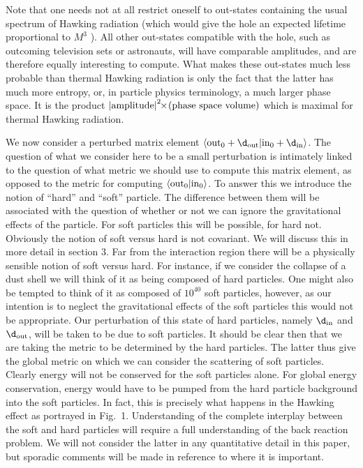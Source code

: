 Note that one needs not at all restrict oneself to out-states
containing the usual spectrum of Hawking radiation (which would give
the hole an expected lifetime proportional to $M^3$ ). All other
out-states compatible with the hole, such as outcoming television sets
or astronauts, will have comparable amplitudes, and are therefore
equally interesting to compute. What makes these out-states much less
probable than thermal Hawking radiation is only the fact that the
latter has much more entropy, or, in particle physics terminology, a
much larger phase space. It is the product $\left|{\rm
amplitude}\right|^2\!\!\times\!{\rm (phase~space~volume)}$ which is
maximal for thermal Hawking radiation.

We now consider a perturbed matrix element $\langle {\rm
out}_0+\d_{{\rm out}}|{\rm in}_0+\d_{{\rm in}}\rangle$. The question of
what we consider here to be a small perturbation is intimately linked
to the question of what metric we should use to compute this matrix
element, as opposed to the metric for computing $\langle {\rm
out}_0|{\rm in}_0\rangle$. To answer this we introduce the notion of
``hard'' and ``soft'' particle. The difference between them will be
associated with the question of whether or not we can ignore the
gravitational effects of the particle. For soft particles this will be
possible, for hard not. Obviously the notion of soft versus hard is not
covariant. We will discuss this in more detail in section 3. Far from
the interaction region there will be a physically sensible notion of
soft versus hard. For instance, if we consider the collapse of a dust
shell we will think of it as being composed of hard particles. One
might also be tempted to think of it as composed of $10^{40}$ soft
particles, however, as our intention is to neglect the gravitational
effects of the soft particles this would not be appropriate. Our
perturbation of this state of hard particles, namely $\d_{{\rm in}}$
and $\d_{{\rm out}}$, will be taken to be due to soft particles. It
should be clear then that we are taking the metric to be determined by
the hard particles. The latter thus give the global metric on which we
can consider the scattering of soft particles. Clearly energy will not
be conserved for the soft particles alone. For global energy
conservation, energy would have to be pumped from the hard particle
background into the soft particles. In fact, this is precisely what
happens in the Hawking effect as portrayed in Fig.~1. Understanding of
the complete interplay between the soft and hard particles will require
a full understanding of the back reaction problem. We will not consider
the latter in any quantitative detail in this paper, but sporadic
comments will be made in reference to where it is important.

